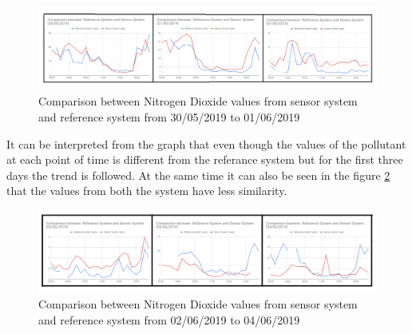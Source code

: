    \begin{figure}[h]
      \begin{center}
      \includegraphics[scale=0.70]{images/figure23.png}
      \end{center}
      \caption{Comparison between Nitrogen Dioxide values from sensor system and reference system from 30/05/2019 to 01/06/2019}
    \label{Nitrogen}
  \end{figure}


  \bigskip

  It can be interpreted from the graph that even though the values of the pollutant at each point of time is different from the referance system but for the first three days the trend is followed. At the same time it can also be seen in the figure \ref{Nitrogen1} that the values from both the system have less similarity.

    \begin{figure}[h]
      \begin{center}
      \includegraphics[scale=0.70]{images/figure24.png}
      \end{center}
      \caption{Comparison between Nitrogen Dioxide values from sensor system and reference system from 02/06/2019 to 04/06/2019}
      \label{Nitrogen1}
    \end{figure}

    

